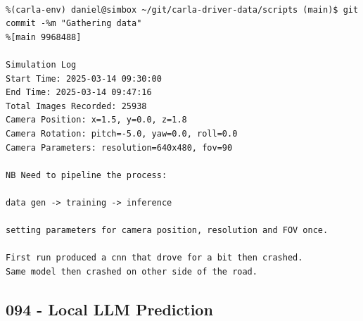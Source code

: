 \begin{verbatim}

%(carla-env) daniel@simbox ~/git/carla-driver-data/scripts (main)$ git commit -%m "Gathering data"
%[main 9968488]

Simulation Log
Start Time: 2025-03-14 09:30:00
End Time: 2025-03-14 09:47:16
Total Images Recorded: 25938
Camera Position: x=1.5, y=0.0, z=1.8
Camera Rotation: pitch=-5.0, yaw=0.0, roll=0.0
Camera Parameters: resolution=640x480, fov=90

NB Need to pipeline the process:

data gen -> training -> inference

setting parameters for camera position, resolution and FOV once.

First run produced a cnn that drove for a bit then crashed. 
Same model then crashed on other side of the road.

\end{verbatim}

\subsection{094 - Local LLM Prediction}
\label{app_res:094}


